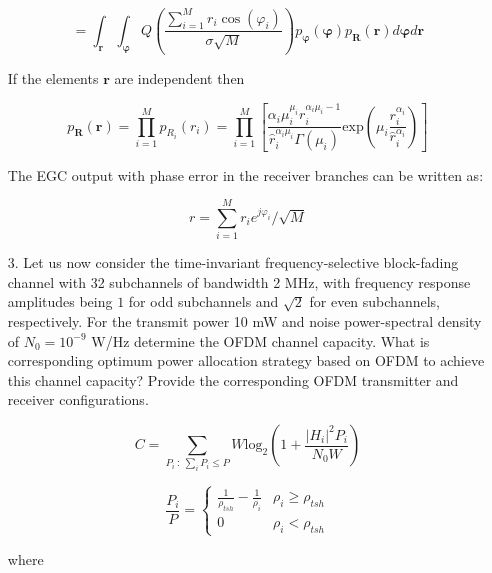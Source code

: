 \documentclass[fleqn]{article}
\begin{document}
\begin{enumerate}
		\begin{equation*}
			= \int_{\mathbf{r}}{\int_{\boldsymbol{\varphi}}{Q\left(\frac{\sum_{i=1}^{M}{r_i\cos(\varphi_i)}}{\sigma\sqrt{M}}\right)p_{\boldsymbol{\varphi}}(\boldsymbol{\varphi})p_{\mathbf{R}}(\mathbf{r})d\boldsymbol{\varphi}}d\mathbf{r}}
		\end{equation*}
		
		If the elements $\mathbf{r}$ are independent then
		
		\begin{equation*}
			p_\mathbf{R}(\mathbf{r}) = \prod_{i=1}^{M}{p_{R_i}(r_i)} = \prod_{i=1}^{M}\left[\frac{\alpha_i\mu_i^{\mu_i}r_i^{\alpha_i\mu_i-1}}{\hat{r}_i^{\alpha_i\mu_i}\Gamma(\mu_i)}\text{exp}\left(\mu_i\frac{r_i^{\alpha_i}}{\hat{r}_i^{\alpha_i}}\right)\right]
		\end{equation*}
		
		The EGC output with phase error in the receiver branches can be written as:
		
		\begin{equation*}
			r = \sum_{i=1}^{M}{r_ie^{j\varphi_i}}/\sqrt{M}
		\end{equation*}
		 
		\item[3.] Let us now consider the time-invariant frequency-selective block-fading channel with 32 subchannels of bandwidth 2 MHz, with frequency response amplitudes being $1$ for odd subchannels and $\sqrt{2}$ for even subchannels, respectively. For the transmit power 10 mW and noise power-spectral density of $N_0=10^{-9}$ W/Hz determine the OFDM channel capacity. What is corresponding optimum power allocation strategy based on OFDM to achieve this channel capacity? Provide the corresponding OFDM transmitter and receiver configurations.
		
		\begin{equation*}
			C = \underset{P_i \ :\ \sum_i{P_i \leq P}}{\sum}{W\text{log}_2\left(1 + \frac{|H_i|^2P_i}{N_0W}\right)}
		\end{equation*}
		
		\begin{equation*}
			\frac{P_i}{P} = \begin{cases}
				\frac{1}{\rho_{tsh}} - \frac{1}{\rho_i} & \rho_i \geq \rho_{tsh} \\
				0 & \rho_i < \rho_{tsh}
			\end{cases}
		\end{equation*}
		
		where
		

\end{enumerate}
\end{document}
